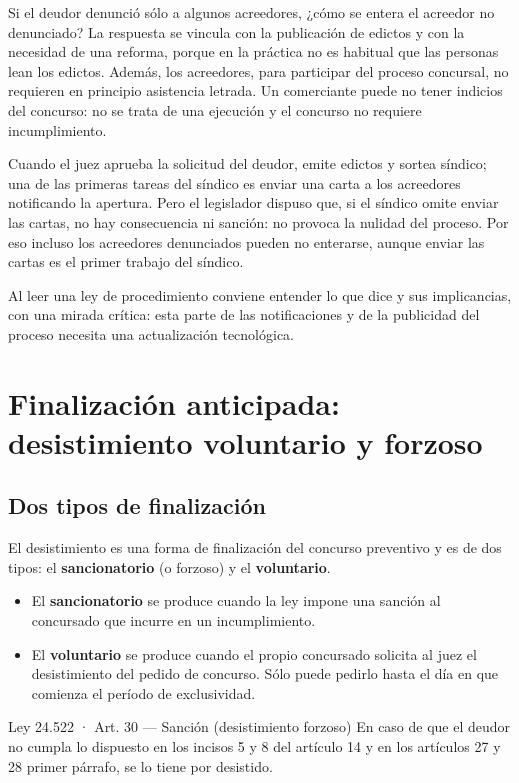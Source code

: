 \documentclass[12pt,oneside]{book}
\begin{document}
Si el deudor denunció sólo a algunos acreedores, ¿cómo se entera el acreedor no denunciado? La respuesta se vincula con la publicación de edictos y con la necesidad de una reforma, porque en la práctica no es habitual que las personas lean los edictos. Además, los acreedores, para participar del proceso concursal, no requieren en principio asistencia letrada. Un comerciante puede no tener indicios del concurso: no se trata de una ejecución y el concurso no requiere incumplimiento.

Cuando el juez aprueba la solicitud del deudor, emite edictos y sortea síndico; una de las primeras tareas del síndico es enviar una carta a los acreedores notificando la apertura. Pero el legislador dispuso que, si el síndico omite enviar las cartas, no hay consecuencia ni sanción: no provoca la nulidad del proceso. Por eso incluso los acreedores denunciados pueden no enterarse, aunque enviar las cartas es el primer trabajo del síndico.

Al leer una ley de procedimiento conviene entender lo que dice y sus implicancias, con una mirada crítica: esta parte de las notificaciones y de la publicidad del proceso necesita una actualización tecnológica.

\section{Finalización anticipada: desistimiento voluntario y forzoso}

\subsection{Dos tipos de finalización}

El desistimiento es una forma de finalización del concurso preventivo y es de dos tipos: el \textbf{sancionatorio} (o forzoso) y el \textbf{voluntario}.
\begin{itemize}
    \item El \textbf{sancionatorio} se produce cuando la ley impone una sanción al concursado que incurre en un incumplimiento.
    \item El \textbf{voluntario} se produce cuando el propio concursado solicita al juez el desistimiento del pedido de concurso. Sólo puede pedirlo hasta el día en que comienza el período de exclusividad.
\end{itemize}

\begin{norma}{Ley 24.522 · Art. 30 — Sanción (desistimiento forzoso)}
En caso de que el deudor no cumpla lo dispuesto en los incisos 5 y 8 del artículo 14 y en los artículos 27 y 28 primer párrafo, se lo tiene por desistido.
\end{norma}
\end{document}
